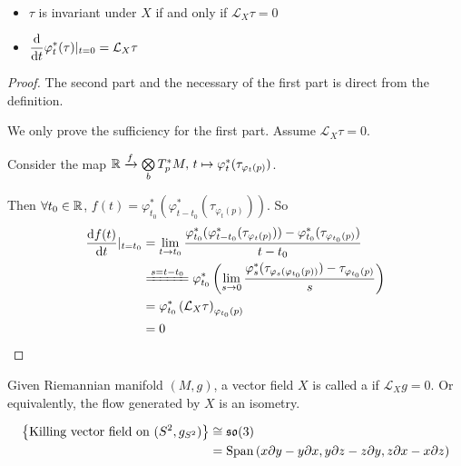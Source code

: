 \begin{proposition}
    \,
    \begin{itemize}
        \item $ \tau  $ is invariant under  $ X  $ if and only if  $ \mathcal{L}_X\tau=0 $ 
        \item  $ \displaystyle\frac{\mathrm{d}}{\mathrm{d} t}\varphi_t^*(\tau)|_{t=0}=\mathcal{L}_X\tau $ 
    \end{itemize}
\end{proposition}
\begin{proof}
    The second part and the necessary of the first part is direct from the definition.

    We only prove the sufficiency for the first part. Assume  $ \mathcal{L}_X\tau=0 $. 

    Consider the map  $ \mathbb R\xrightarrow{ f}\bigotimes\limits_{b}T_p^*M ,\,t\mapsto \varphi_t^*(\tau_{\varphi_t(p)})$.
    
    Then  $ \forall t_0\in \mathbb R $,  $ f(t)=\varphi_{t_0}^*(\varphi_{t-t_0}^*(\tau_{\varphi_{t}(p)})) $.
    So 
    \begin{equation}
        \begin{aligned}
            \frac{\dd f(t)}{\dd t}|_{t=t_0}&=\lim_{t\to t_0}\frac{\varphi_{t_0}^*(\varphi_{t-t_0}^*(\tau_{\varphi_t(p)}))-\varphi_{t_0}^*(\tau_{\varphi_{t_0}(p)})}{t-t_0}\\
            &\xlongequal{s=t-t_0}\varphi_{t_0}^*\left(\lim_{s\to 0}\frac{\varphi^*_{s}(\tau_{\varphi_s(\varphi_{t_0}(p))})-\tau_{\varphi_{t_0}(p)}}{s}\right)\\
            &=\varphi_{t_0}^*\left(\mathcal{L}_X\tau\right)_{\varphi_{t_0}(p)}\\
            &=0
        \end{aligned}
    \end{equation}
\end{proof}
\begin{definition}
    Given Riemannian manifold  $ (M,g)$, a vector field  $ X  $ is called a  if  $ \mathcal{L}_Xg=0 $. Or equivalently, the flow generated by  $ X  $ is an isometry.
\end{definition}
\begin{example}
    \begin{align*}
        \left\{\text{Killing vector field on }(S^2,g_{S^2})\right\}&\cong \mathfrak{so}(3)\\
        &=\mathrm{Span}\left(x\partial y-y\partial x,y\partial z-z\partial y,z\partial x-x\partial z\right)
    \end{align*}
\end{example}
